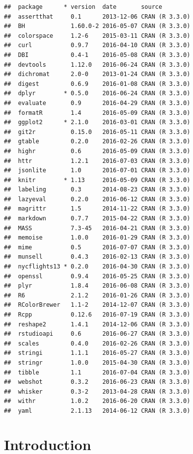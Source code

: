 \documentclass[]{tufte-book}
\begin{document}
\begin{verbatim}
##  package      * version  date       source        
##  assertthat     0.1      2013-12-06 CRAN (R 3.3.0)
##  BH             1.60.0-2 2016-05-07 CRAN (R 3.3.0)
##  colorspace     1.2-6    2015-03-11 CRAN (R 3.3.0)
##  curl           0.9.7    2016-04-10 CRAN (R 3.3.0)
##  DBI            0.4-1    2016-05-08 CRAN (R 3.3.0)
##  devtools       1.12.0   2016-06-24 CRAN (R 3.3.0)
##  dichromat      2.0-0    2013-01-24 CRAN (R 3.3.0)
##  digest         0.6.9    2016-01-08 CRAN (R 3.3.0)
##  dplyr        * 0.5.0    2016-06-24 CRAN (R 3.3.0)
##  evaluate       0.9      2016-04-29 CRAN (R 3.3.0)
##  formatR        1.4      2016-05-09 CRAN (R 3.3.0)
##  ggplot2      * 2.1.0    2016-03-01 CRAN (R 3.3.0)
##  git2r          0.15.0   2016-05-11 CRAN (R 3.3.0)
##  gtable         0.2.0    2016-02-26 CRAN (R 3.3.0)
##  highr          0.6      2016-05-09 CRAN (R 3.3.0)
##  httr           1.2.1    2016-07-03 CRAN (R 3.3.0)
##  jsonlite       1.0      2016-07-01 CRAN (R 3.3.0)
##  knitr        * 1.13     2016-05-09 CRAN (R 3.3.0)
##  labeling       0.3      2014-08-23 CRAN (R 3.3.0)
##  lazyeval       0.2.0    2016-06-12 CRAN (R 3.3.0)
##  magrittr       1.5      2014-11-22 CRAN (R 3.3.0)
##  markdown       0.7.7    2015-04-22 CRAN (R 3.3.0)
##  MASS           7.3-45   2016-04-21 CRAN (R 3.3.0)
##  memoise        1.0.0    2016-01-29 CRAN (R 3.3.0)
##  mime           0.5      2016-07-07 CRAN (R 3.3.0)
##  munsell        0.4.3    2016-02-13 CRAN (R 3.3.0)
##  nycflights13 * 0.2.0    2016-04-30 CRAN (R 3.3.0)
##  openssl        0.9.4    2016-05-25 CRAN (R 3.3.0)
##  plyr           1.8.4    2016-06-08 CRAN (R 3.3.0)
##  R6             2.1.2    2016-01-26 CRAN (R 3.3.0)
##  RColorBrewer   1.1-2    2014-12-07 CRAN (R 3.3.0)
##  Rcpp           0.12.6   2016-07-19 CRAN (R 3.3.0)
##  reshape2       1.4.1    2014-12-06 CRAN (R 3.3.0)
##  rstudioapi     0.6      2016-06-27 CRAN (R 3.3.0)
##  scales         0.4.0    2016-02-26 CRAN (R 3.3.0)
##  stringi        1.1.1    2016-05-27 CRAN (R 3.3.0)
##  stringr        1.0.0    2015-04-30 CRAN (R 3.3.0)
##  tibble         1.1      2016-07-04 CRAN (R 3.3.0)
##  webshot        0.3.2    2016-06-23 CRAN (R 3.3.0)
##  whisker        0.3-2    2013-04-28 CRAN (R 3.3.0)
##  withr          1.0.2    2016-06-20 CRAN (R 3.3.0)
##  yaml           2.1.13   2014-06-12 CRAN (R 3.3.0)
\end{verbatim}

\chapter{Introduction}\label{intro}
\end{document}
